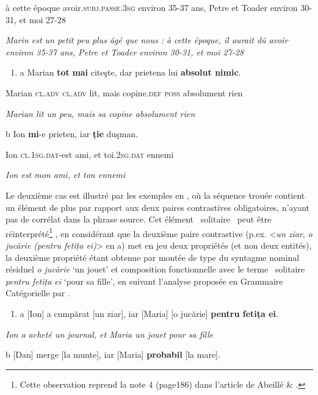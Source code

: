 à cette époque avoir.\textsc{subj.passe.3sg} environ 35-37 ans, Petre et Toader environ 30-31, et moi 27-28 

{\itshape
Marin est un petit peu plus âgé que nous : à cette époque, il aurait dû avoir environ 35-37 ans, Petre et Toader environ 30-31, et moi 27-28} 


\begin{enumerate}
\item \label{bkm:Ref289416863}a  Marian \textbf{tot} \textbf{mai} citeşte, dar prietena lui \textbf{absolut nimic}.


\end{enumerate}
Marian \textsc{cl.adv cl.adv} lit, mais copine.\textsc{def poss} absolument rien 

    \textit{Marian lit un peu, mais sa copine absolument rien } 

  b  Ion \textbf{mi}-e prieten, iar \textbf{ție} duşman.

    Ion \textsc{cl.1sg.dat-}est ami, et toi\textsc{.2sg.dat} ennemi 

    \textit{Ion est mon ami, et ton ennemi} 

Le deuxième cas est illustré par les exemples en , où la séquence trouée contient un élément de plus par rapport aux deux paires contrastives obligatoires, n'ayant pas de corrélat dans la phrase source. Cet élément {\guillemotleft}~solitaire~{\guillemotright} peut être réinterprété\footnote{Cette observation reprend la note 4 (page186) dans l'article de Abeillé \& \citet{Mouret2010}.} , en considérant que la deuxième paire contrastive (p.ex. {\textless}\textit{un ziar}, \textit{o jucărie (pentru fetița ei)}{\textgreater} en a) met en jeu deux propriétés (et non deux entités), la deuxième propriété étant obtenue par montée de type du syntagme nominal résiduel \textit{o jucărie} `un jouet' et composition fonctionnelle avec le terme {\guillemotleft}~solitaire~{\guillemotright} \textit{pentru fetița ei} `pour sa fille', en suivant l'analyse proposée en Grammaire Catégorielle par \citet{Steedman2000}. 


\begin{enumerate}
\item \label{bkm:Ref289418814}a  [Ion] a cumpărat [un ziar], iar [Maria] [o jucărie] \textbf{pentru fetița ei}.


\end{enumerate}
    \textit{Ion a acheté un journal, et Maria un jouet pour sa fille } 

  b  [Dan] merge [la munte], iar [Maria] \textbf{probabil} [la mare]. 

